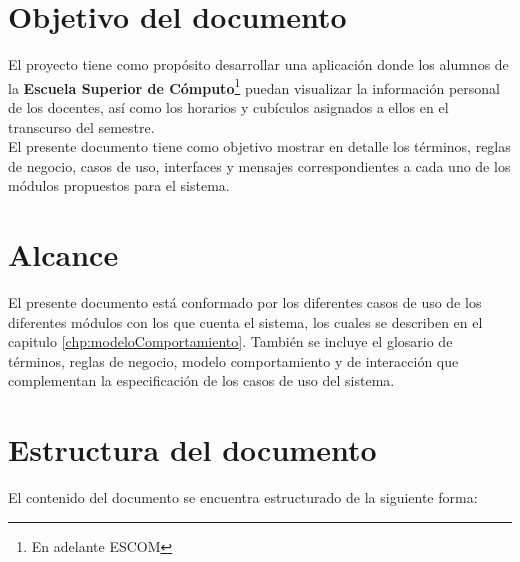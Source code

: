 \section{Objetivo del documento}\label{sec:objetivo}

El proyecto tiene como propósito desarrollar una aplicación donde los alumnos de la \textbf{Escuela Superior de Cómputo}\footnote{En adelante ESCOM} puedan visualizar la información personal de los docentes, así como los horarios y cubículos asignados a ellos en el transcurso del semestre.\\

El presente documento tiene como objetivo mostrar en detalle los términos, reglas de negocio, casos de uso, interfaces y mensajes correspondientes a cada uno de los módulos propuestos para el sistema.

\section{Alcance}\label{sec:alcance}

El presente documento está conformado por los diferentes casos de uso de los diferentes módulos con los que cuenta el sistema, los cuales se describen en el capitulo \ref{chp:modeloComportamiento}. También se incluye el glosario de términos, reglas de negocio, modelo comportamiento y de interacción que complementan la especificación de los casos de uso del sistema.

\section{Estructura del documento}\label{sec:estructuraDocumento}

El contenido del documento se encuentra estructurado de la siguiente forma:\\


